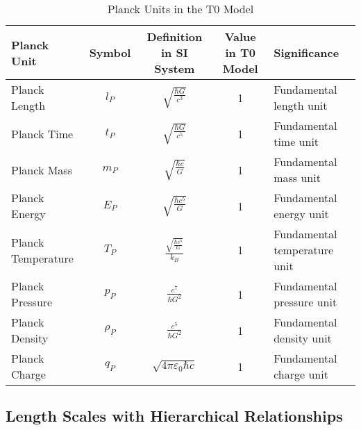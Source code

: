 \documentclass[12pt,a4paper]{article}
\begin{document}
	\begin{table}[H]
		\centering
		\begin{adjustbox}{width=0.95\textwidth}
			\begin{tabular}{lcccl}
				\toprule
				\textbf{Planck Unit} & \textbf{Symbol} & \textbf{Definition in SI System} & \textbf{Value in T0 Model} & \textbf{Significance} \\
				\midrule
				Planck Length & \(l_P\) & \(\sqrt{\frac{\hbar G}{c^3}}\) & 1 & Fundamental length unit \\
				Planck Time & \(t_P\) & \(\sqrt{\frac{\hbar G}{c^5}}\) & 1 & Fundamental time unit \\
				Planck Mass & \(m_P\) & \(\sqrt{\frac{\hbar c}{G}}\) & 1 & Fundamental mass unit \\
				Planck Energy & \(E_P\) & \(\sqrt{\frac{\hbar c^5}{G}}\) & 1 & Fundamental energy unit \\
				Planck Temperature & \(T_P\) & \(\frac{\sqrt{\frac{\hbar c^5}{G}}}{k_B}\) & 1 & Fundamental temperature unit \\
				Planck Pressure & \(p_P\) & \(\frac{c^7}{\hbar G^2}\) & 1 & Fundamental pressure unit \\
				Planck Density & \(\rho_P\) & \(\frac{c^5}{\hbar G^2}\) & 1 & Fundamental density unit \\
				Planck Charge & \(q_P\) & \(\sqrt{4\pi \varepsilon_0 \hbar c}\) & 1 & Fundamental charge unit \\
				\bottomrule
			\end{tabular}
		\end{adjustbox}
		\caption{Planck Units in the T0 Model}
		\label{tab:planck_units}
	\end{table}
	
	\subsection*{Length Scales with Hierarchical Relationships}
	
\end{document}
